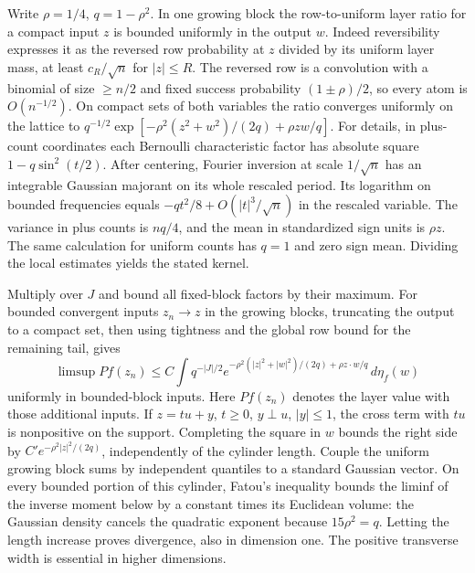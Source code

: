 Write $\rho=1/4$, $q=1-\rho^2$. In one growing block the row-to-uniform
layer ratio for a compact input $z$ is bounded uniformly in the output $w$.
Indeed reversibility expresses it as the reversed row probability at $z$
divided by its uniform layer mass, at least $c_R/\sqrt n$ for $|z|\le R$.
The reversed row is a convolution with a binomial of size $\ge n/2$ and
fixed success probability $(1\pm\rho)/2$, so every atom is $O(n^{-1/2})$.
On compact sets of both variables the ratio converges uniformly on the
lattice to $q^{-1/2}\exp[-\rho^2(z^2+w^2)/(2q)+\rho zw/q]$.
For details, in plus-count coordinates each Bernoulli characteristic factor
has absolute square $1-q\sin^2(t/2)$. After centering, Fourier inversion at
scale $1/\sqrt n$ has an integrable Gaussian majorant on its whole
rescaled period. Its logarithm on bounded frequencies equals
$-qt^2/8+O(|t|^3/\sqrt n)$ in the rescaled variable. The variance in
plus counts is $nq/4$, and the mean in standardized sign units is $\rho z$.
The same calculation for uniform counts has $q=1$ and zero sign mean.
Dividing the local estimates yields the stated kernel.

Multiply over $J$ and bound all fixed-block factors by their maximum.
For bounded convergent inputs $z_n\to z$ in the growing blocks, truncating
the output to a compact set, then using tightness and the global row bound
for the remaining tail, gives
\[
 \limsup Pf(z_n)\le C\int q^{-|J|/2}
 e^{-\rho^2(|z|^2+|w|^2)/(2q)+\rho z\cdot w/q}\,d\eta_f(w)
\]
uniformly in bounded-block inputs. Here $Pf(z_n)$ denotes the layer value
with those additional inputs. If $z=tu+y$, $t\ge0$, $y\perp u$, $|y|\le1$,
the cross term with $tu$ is nonpositive on the support. Completing the square
in $w$ bounds the right side by $C'e^{-\rho^2|z|^2/(2q)}$, independently
of the cylinder length. Couple the uniform growing block sums by independent
quantiles to a standard Gaussian vector. On every bounded portion of this
cylinder, Fatou's inequality bounds the liminf of the inverse moment below
by a constant times its Euclidean volume: the Gaussian density cancels the
quadratic exponent because $15\rho^2=q$. Letting the length increase proves
divergence, also in dimension one. The positive transverse width is essential
in higher dimensions.
